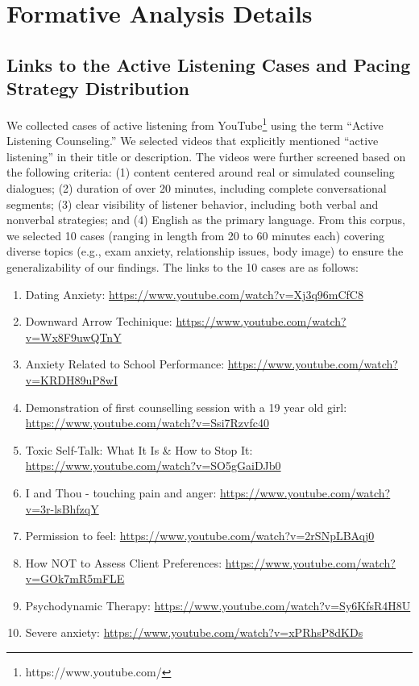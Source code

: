 \section{Formative Analysis Details}
\subsection{Links to the Active Listening Cases and Pacing Strategy Distribution}
\label{appx:links}
We collected cases of active listening from YouTube\footnote{https://www.youtube.com/} using the term ``Active Listening Counseling.'' We selected videos that explicitly mentioned ``active listening'' in their title or description. The videos were further screened based on the following criteria: (1) content centered around real or simulated counseling dialogues; (2) duration of over 20 minutes, including complete conversational segments; (3) clear visibility of listener behavior, including both verbal and nonverbal strategies; and (4) English as the primary language. From this corpus, we selected 10 cases (ranging in length from 20 to 60 minutes each) covering diverse topics (e.g., exam anxiety, relationship issues, body image) to ensure the generalizability of our findings. The links to the 10 cases are as follows:
\sloppy
\begin{enumerate}
    \item Dating Anxiety: \url{https://www.youtube.com/watch?v=Xj3q96mCfC8}
    \item Downward Arrow Techinique: \url{https://www.youtube.com/watch?v=Wx8F9uwQTnY}
    \item Anxiety Related to School Performance: \url{https://www.youtube.com/watch?v=KRDH89uP8wI}
    \item Demonstration of first counselling session with a 19 year old girl: \url{https://www.youtube.com/watch?v=Ssi7Rzvfc40}
    \item Toxic Self-Talk: What It Is \& How to Stop It: \url{https://www.youtube.com/watch?v=SO5gGaiDJb0}
    \item I and Thou - touching pain and anger: \url{https://www.youtube.com/watch?v=3r-lsBhfzqY}
    \item Permission to feel: \url{https://www.youtube.com/watch?v=2rSNpLBAqj0}
    \item How NOT to Assess Client Preferences: \url{https://www.youtube.com/watch?v=GOk7mR5mFLE}
    \item Psychodynamic Therapy: \url{https://www.youtube.com/watch?v=Sy6KfsR4H8U}
    \item Severe anxiety: \url{https://www.youtube.com/watch?v=xPRhsP8dKDs}

\end{enumerate}

